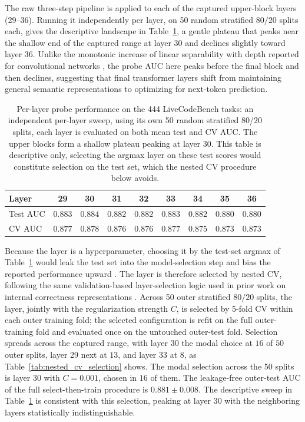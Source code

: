 The raw three-step pipeline is applied to each of the captured upper-block layers (29--36). Running it independently per layer, on 50 random stratified $80/20$ splits each, gives the descriptive landscape in Table~\ref{tab:layer_sweep}, a gentle plateau that peaks near the shallow end of the captured range at layer 30 and declines slightly toward layer 36. Unlike the monotonic increase of linear separability with depth reported for convolutional networks \citep{alain2016probes}, the probe AUC here peaks before the final block and then declines, suggesting that final transformer layers shift from maintaining general semantic representations to optimizing for next-token prediction.

\begin{table}[h]
\centering
\begin{tabular}{lcccccccc}
\toprule
Layer & 29 & 30 & 31 & 32 & 33 & 34 & 35 & 36 \\
\midrule
Test AUC & $0.883$ & $0.884$ & $0.882$ & $0.882$ & $0.883$ & $0.882$ & $0.880$ & $0.880$ \\
CV AUC   & $0.877$ & $0.878$ & $0.876$ & $0.876$ & $0.877$ & $0.875$ & $0.873$ & $0.873$ \\
\bottomrule
\end{tabular}
\caption{Per-layer probe performance on the 444 LiveCodeBench tasks: an independent per-layer sweep, using its own 50 random stratified 80/20 splits, each layer is evaluated on both mean test and CV AUC. The upper blocks form a shallow plateau peaking at layer 30. This table is descriptive only, selecting the argmax layer on these test scores would constitute selection on the test set, which the nested CV procedure below avoids.}
\label{tab:layer_sweep}
\end{table}

Because the layer is a hyperparameter, choosing it by the test-set argmax of Table~\ref{tab:layer_sweep} would leak the test set into the model-selection step and bias the reported performance upward \citep{cawley2010overfitting}. The layer is therefore selected by nested CV, following the same validation-based layer-selection logic used in prior work on internal correctness representations \citep{ribeiro2025internal}. Across 50 outer stratified $80/20$ splits, the layer, jointly with the regularization strength $C$, is selected by 5-fold CV within each outer training fold; the selected configuration is refit on the full outer-training fold and evaluated once on the untouched outer-test fold. Selection spreads across the captured range, with layer 30 the modal choice at $16$ of $50$ outer splits, layer 29 next at $13$, and layer 33 at $8$, as Table~\ref{tab:nested_cv_selection} shows. The modal selection across the 50 splits is layer 30 with $C = 0.001$, chosen in $16$ of them. The leakage-free outer-test AUC of the full select-then-train procedure is $0.881 \pm 0.008$. The descriptive sweep in Table~\ref{tab:layer_sweep} is consistent with this selection, peaking at layer 30 with the neighboring layers statistically indistinguishable.


